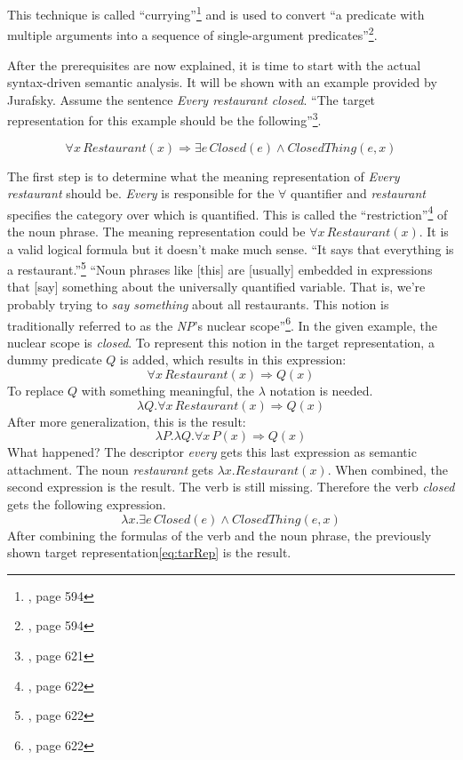 \documentclass[12pt,twoside]{scrartcl}
\theoremstyle{plain}
\theoremstyle{definition}
\theoremstyle{remark}
\begin{document}
		This technique is called ``currying''\footnote{\cite{Jurafsky2009a}, page 594} and is used to convert ``a predicate with multiple arguments into a sequence of single-argument predicates''\footnote{\cite{Jurafsky2009a}, page 594}.
		
		After the prerequisites are now explained, it is time to start with the actual syntax-driven semantic analysis. It will be shown with an example provided by Jurafsky. Assume the sentence \textit{Every restaurant closed}. ``The target representation for this example should be the following''\footnote{\cite{Jurafsky2009}, page 621}.
		
		\begin{equation}
		\label{eq:tarRep}
			\forall x \,Restaurant(x) \Rightarrow \exists e \,Closed(e) \wedge ClosedThing(e,x)
		\end{equation}
		
		The first step is to determine what the meaning representation of \textit{Every restaurant} should be. \textit{Every} is responsible for the $\forall$ quantifier and \textit{restaurant} specifies the category over which is quantified. This is called the ``restriction''\footnote{\cite{Jurafsky2009}, page 622} of the noun phrase. The meaning representation could be $\forall x\,Restaurant(x)$. It is a valid logical formula but it doesn't make much sense. ``It says that everything is a restaurant.''\footnote{\cite{Jurafsky2009}, page 622} ``Noun phrases like [this] are [usually] embedded in expressions that [say] something about the universally quantified variable. That is, we're probably trying to \textit{say something} about all restaurants. This notion is traditionally referred to as the \textit{NP}'s nuclear scope''\footnote{\cite{Jurafsky2009}, page 622}. In the given example, the nuclear scope is \textit{closed}. To represent this notion in the target representation, a dummy predicate $Q$ is added, which results in this expression:
		\[
			\forall x\,Restaurant(x) \Rightarrow Q(x)
		\]
		To replace $Q$ with something meaningful, the $\lambda$ notation is needed.
		\[
			\lambda Q.\forall x\,Restaurant(x) \Rightarrow Q(x)
		\] 
		After more generalization, this is the result:
		\[
			\lambda P.\lambda Q.\forall x\,P(x) \Rightarrow Q(x)
		\]
		What happened? The descriptor \textit{every} gets this last expression as semantic attachment. The noun \textit{restaurant} gets $\lambda x.Restaurant(x)$. When combined, the second expression is the result. The verb is still missing. Therefore the verb \textit{closed} gets the following expression.
		\[
			\lambda x.\exists e\,Closed(e) \wedge ClosedThing(e,x)
		\]
		After combining the formulas of the verb and the noun phrase, the previously shown target representation\eqref{eq:tarRep} is the result.
		
\end{document}
